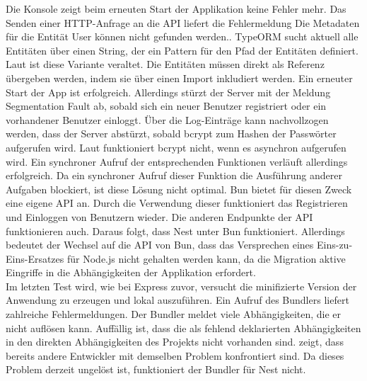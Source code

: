 \noindent
Die Konsole zeigt beim erneuten Start der Applikation keine Fehler mehr. Das Senden einer HTTP-Anfrage an die API liefert die Fehlermeldung \glq Die Metadaten für die Entität User können nicht gefunden werden.\grq{}. TypeORM sucht aktuell alle Entitäten über einen String, der ein Pattern für den Pfad der Entitäten definiert. Laut \cite{TypeORM.2021} ist diese Variante veraltet. Die Entitäten müssen direkt als Referenz übergeben werden, indem sie über einen Import inkludiert werden. \newline
Ein erneuter Start der App ist erfolgreich. Allerdings stürzt der Server mit der Meldung \glq Segmentation Fault\grq{} ab, sobald sich ein neuer Benutzer registriert oder ein vorhandener Benutzer einloggt. Über die Log-Einträge kann nachvollzogen werden, dass der Server abstürzt, sobald \glq bcrypt\grq{} zum Hashen der Passwörter aufgerufen wird. Laut \cite{Sumner.2023} funktioniert \glq bcrypt\grq{} nicht, wenn es asynchron aufgerufen wird. Ein synchroner Aufruf der entsprechenden Funktionen verläuft allerdings erfolgreich. Da ein synchroner Aufruf dieser Funktion die Ausführung anderer Aufgaben blockiert, ist diese Lösung nicht optimal. Bun bietet für diesen Zweck eine eigene API an. Durch die Verwendung dieser funktioniert das Registrieren und Einloggen von Benutzern wieder. Die anderen Endpunkte der API funktionieren auch. Daraus folgt, dass Nest unter Bun funktioniert. Allerdings bedeutet der Wechsel auf die API von Bun, dass das Versprechen eines Eins-zu-Eins-Ersatzes für Node.js nicht gehalten werden kann, da die Migration aktive Eingriffe in die Abhängigkeiten der Applikation erfordert.\\

\noindent
Im letzten Test wird, wie bei Express zuvor, versucht die minifizierte Version der Anwendung zu erzeugen und lokal auszuführen. Ein Aufruf des Bundlers liefert zahlreiche Fehlermeldungen. Der Bundler meldet viele Abhängigkeiten, die er nicht auflösen kann. Auffällig ist, dass die als fehlend deklarierten Abhängigkeiten in den direkten Abhängigkeiten des Projekts nicht vorhanden sind. \cite{Postek.2023} zeigt, dass bereits andere Entwickler mit demselben Problem konfrontiert sind. Da dieses Problem derzeit ungelöst ist, funktioniert der Bundler für Nest nicht.

